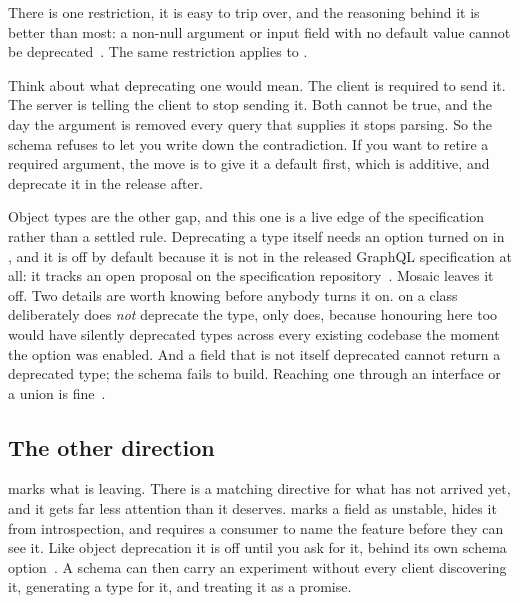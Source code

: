 %
There is one restriction, it is easy to trip over, and the reasoning behind it
is better than most: a non-null argument or input field with no default value
cannot be deprecated~\autocite{chillicream2026versioning}. The same restriction
applies to .

Think about what deprecating one would mean. The client is required to send it.
The server is telling the client to stop sending it. Both cannot be true, and
the day the argument is removed every query that supplies it stops parsing. So
the schema refuses to let you write down the contradiction. If you want to
retire a required argument, the move is to give it a default first, which is
additive, and deprecate it in the release after.

%
Object types are the other gap, and this one is a live edge of the
specification rather than a settled rule. Deprecating a type itself needs an
option turned on in , and it is off by
default because it is not in the released GraphQL specification at all: it
tracks an open proposal on the specification
repository~\autocite{graphqlspec2026objectdeprecation}. Mosaic leaves it off.
Two details are worth knowing before anybody turns it on. \code{[Obsolete]} on a
class deliberately does \emph{not} deprecate the type, only
\code{[GraphQLDeprecated]} does, because honouring \code{[Obsolete]} here too
would have silently deprecated types across every existing codebase the moment
the option was enabled. And a field that is not itself deprecated cannot return
a deprecated type; the schema fails to build. Reaching one through an interface
or a union is fine~\autocite{chillicream2026versioning}.

\subsection*{The other direction}

%
 marks what is leaving. There is a matching directive for what
has not arrived yet, and it gets far less attention than it deserves.
 marks a field as unstable, hides it from introspection,
and requires a consumer to name the feature before they can see it. Like object
deprecation it is off until you ask for it, behind its own schema
option~\autocite{chillicream2026versioning}. A schema can then carry an
experiment
without every client discovering it, generating a type for it, and treating it
as a promise.

